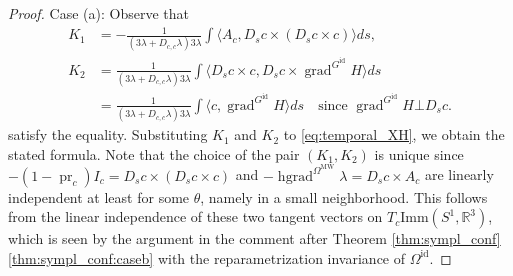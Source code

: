\documentclass[12pt]{amsart}
\theoremstyle{definition}
\newcommand{\R}{\mathbb R}
\newcommand{\id}{\mathrm{id}}
\newcommand{\Imm}{\mathrm{Imm}}
\newcommand{\OmMW}{\Omega^{\operatorname{MW}}}
\def\la{\lambda}
\def\Om{\Omega}
\def\x{\times}
\def\R{{\mathbb R}}
\let\on=\operatorname
\begin{document}
\begin{proof}
    Case (a): 
    Observe that 
    \begin{align}
        K_1&=-\frac{1}{(3\la+D_{c,c}\la)3\la}\int \langle A_c, D_sc \x (D_s c \x c)\rangle ds, 
        \\
        K_2&=\frac{1}{(3\la+D_{c,c}\la)3\la}\int \langle D_s c \x c,  D_s c \x \on{grad}^{G^\id} H\rangle ds
    \\&
    =\frac{1}{(3\la+D_{c,c}\la)3\la}\int \langle  c,   \on{grad}^{G^\id} H\rangle ds\quad\text{since } \on{grad}^{G^\id} H \bot D_sc.
    \end{align}
    satisfy the equality. Substituting $K_1$ and $K_2$ to \eqref{eq:temporal_XH}, we obtain the stated formula. 
    Note that the choice of the pair $(K_1,K_2)$ is unique since $ -(1-\on{pr}_c)I_c=D_sc \x (D_s c \x c)$ and $-\on{hgrad}^{\OmMW}\la= D_s c \x A_c$ are linearly independent at least for some $\theta$, namely in a small neighborhood. This follows from the linear independence of these two tangent vectors on $T_c\Imm(S^1,\R^3)$, which is seen by the argument in the comment after Theorem \ref{thm:sympl_conf} \ref{thm:sympl_conf:caseb} with the reparametrization invariance of $\Om^\id$.



\end{proof}
\end{document}
